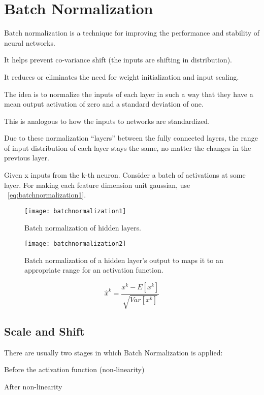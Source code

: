 	\section{Batch Normalization}

	\begin{bulletedlist}
		\item Batch normalization is a technique for improving the performance and stability of neural networks.
		\item It helps prevent co-variance shift (the inputs are shifting in distribution).
		\item It reduces or eliminates the need for weight initialization and input scaling.
		\item The idea is to normalize the inputs of each layer in such a way that they have a mean output activation of zero and a standard deviation of one.
		\item This is analogous to how the inputs to networks are standardized.
		\item Due to these normalization ``layers'' between the fully connected layers, the range of input distribution of each layer stays the same, no matter the changes in the previous layer.
		\item Given x inputs from the k-th neuron. Consider a batch of activations at some layer. For making each feature dimension unit gaussian, use \equationname~\ref{eq:batchnormalization1}.
	\end{bulletedlist}

 	\begin{figure}[h]
		\centering
		\texttt{[image: batchnormalization1]}
		\caption[Batch normalization of hidden layers]{Batch normalization of hidden layers.}
		\label{fig:batchnormalization1}
	\end{figure}
 	\begin{figure}[h]
		\centering
		\texttt{[image: batchnormalization2]}
		\caption[Batch normalization and activation functions]{Batch normalization of a hidden layer's output to maps it to an appropriate range for an activation function.}
		\label{fig:batchnormalization2}
	\end{figure}

	\begin{equation}
		\hat{x}^k = \frac{x^k - E\left[x^k \right]}{\sqrt{Var\left[x^k \right]}}
		\label{eq:batchnormalization1}
	\end{equation}

	\subsection{Scale and Shift}
There are usually two stages in which Batch Normalization is applied:
	\begin{numberedlist}
		\item Before the activation function (non-linearity)
		\item After non-linearity
	\end{numberedlist}

